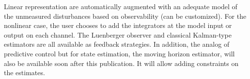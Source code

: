 Linear representation are automatically augmented with an adequate model of the unmeasured disturbances based on observability (can be customized). For the nonlinear case, the user chooses to add the integrators at the model input or output on each channel. The Luenberger observer and classical Kalman-type estimators are all available as feedback strategies. In addition, the analog of predictive control but for state estimation, the moving horizon estimator, will also be available soon after this publication. It will allow adding constraints on the estimates.

